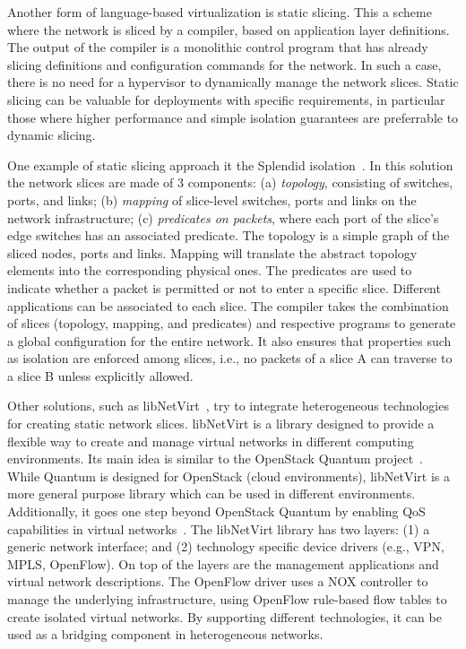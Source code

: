 Another form of language-based virtualization is static slicing. 
This a scheme where the network is sliced by a compiler, based on application layer definitions.
The output of the compiler is a monolithic control program that has already slicing definitions and configuration commands for the network.
In such a case, there is no need for a hypervisor to dynamically manage the network slices.
Static slicing can be valuable for deployments with specific requirements, in particular those where higher performance and simple isolation guarantees are preferrable to
dynamic slicing.

One example of static slicing approach it the Splendid isolation~\cite{gutz2012}.
In this solution the network slices are made of 3 components:
(a) \textit{topology}, consisting of switches, ports, and links;
(b) \textit{mapping} of slice-level switches, ports and links on the network infrastructure;
(c) \textit{predicates on packets}, where each port of the slice's edge switches has an associated predicate.
The topology is a simple graph of the sliced nodes, ports and links.
Mapping will translate the abstract topology elements into the corresponding physical ones.
The predicates are used to indicate whether a packet is permitted or not to enter a specific slice. 
Different applications can be associated to each slice.
The compiler takes the combination of slices (topology, mapping, and predicates) and respective programs to generate a global configuration for the entire network. 
It also ensures that properties such as isolation are enforced among slices, i.e., no packets of a slice A can traverse to a slice B unless 
explicitly allowed.

Other solutions, such as libNetVirt~\cite{turull2012}, try to integrate heterogeneous technologies for creating 
static network slices. libNetVirt is a library designed to provide a flexible way to create and manage virtual 
networks in different computing environments. Its main idea is similar to the OpenStack Quantum 
project~\cite{quantumcommunicty2012}. While Quantum is designed for OpenStack (cloud environments), 
libNetVirt is a more general purpose library which can be used in different environments. Additionally, 
it goes one step beyond OpenStack Quantum by enabling QoS capabilities in virtual networks~\cite{turull2012}.
The libNetVirt library has two layers: (1) a generic network interface; and (2) technology specific device drivers 
(e.g., VPN, MPLS, OpenFlow). On top of the layers are the management applications and virtual network descriptions.
The OpenFlow driver uses a NOX controller to manage the underlying infrastructure, using OpenFlow rule-based flow 
tables to create isolated virtual networks. By supporting different technologies, it can be used as a bridging 
component in heterogeneous networks.

